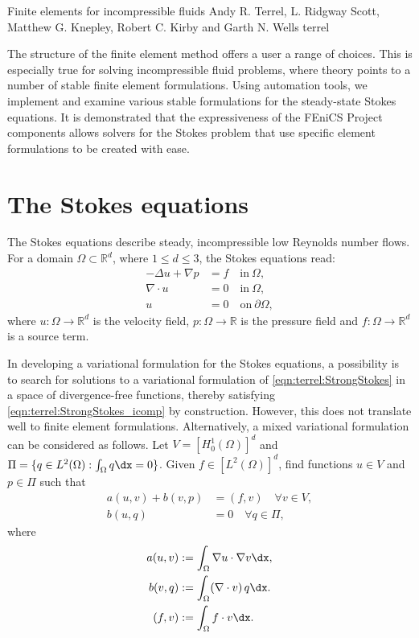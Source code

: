               {Finite elements for incompressible fluids}
              {Andy R. Terrel, L. Ridgway Scott, Matthew G. Knepley,
               Robert C. Kirby and Garth N. Wells}
              {terrel}


The structure of the finite element method offers a user a range of
choices.  This is especially true for solving incompressible fluid
problems, where theory points to a number of stable finite element
formulations. Using automation tools, we implement and examine various
stable formulations for the steady-state Stokes equations.  It is
demonstrated that the expressiveness of the FEniCS Project components
allows solvers for the Stokes problem that use specific element
formulations to be created with ease.
\section{The Stokes equations}
\label{sec:terrel:Stokes}

The Stokes equations describe steady, incompressible low Reynolds number
flows. For a domain $\Omega \subset \mathbb{R}^{d}$, where $1 \le d \le 3$,
the Stokes equations read:
%
\begin{align}
     -\Delta u + \nabla p &= f \quad \mbox{in} \ \Omega,
\label{eqn:terrel:StrongStokes}
\\
      \nabla\cdot u &= 0 \quad \mbox{in} \ \Omega,
\label{eqn:terrel:StrongStokes_icomp}
\\
      u &= 0 \quad \mbox{on} \  \partial \Omega,
\end{align}
%
where $u : \Omega \rightarrow \mathbb{R}^{d}$ is the velocity field, $p
: \Omega \rightarrow \mathbb{R}$ is the pressure field and $f : \Omega
\rightarrow \mathbb{R}^{d}$ is a source term.

In developing a variational formulation for the Stokes equations,
a possibility is to search for solutions to a variational formulation of
\eqref{eqn:terrel:StrongStokes} in a space of divergence-free functions,
thereby satisfying \eqref{eqn:terrel:StrongStokes_icomp} by construction.
However, this does not translate well to finite element
formulations. Alternatively, a mixed variational formulation can be
considered as follows. Let $V = [H^{1}_{0}(\Omega)]^d$ and $\Pi = \{q \in
L^2(\Omega) : \int_\Omega q \dx = 0\}$.  Given $f \in [L^{2}(\Omega)]^d$,
find functions $u \in V$ and $p \in \Pi$ such that
%
\begin{align}
    a(u, v) + b(v, p)  &=  (f, v) \quad \forall v \in V,
\label{eqn:stokes_momentum}
\\
    b(u, q) &= 0 \quad \forall q \in \Pi,
\label{eqn:stokes_continuity}
\end{align}
%
where
%
\begin{align}
  a(u, v) &:= \int_\Omega \nabla{u} \cdot \nabla v \dx,
\\
  b(v, q) &:= \int_\Omega (\nabla\cdot v) \, q \dx.
\\
  (f, v) &:= \int_\Omega f \cdot v \dx.
\end{align}
